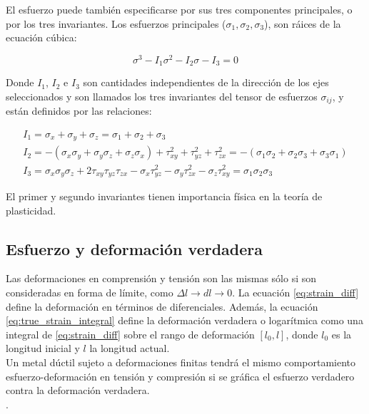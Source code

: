 El esfuerzo puede también especificarse por sus tres componentes principales, o por 
los tres invariantes. Los esfuerzos principales ($\sigma_1, \sigma_2, \sigma_3$), son 
ráices de la ecuación cúbica:

\begin{equation}
\sigma^3 - I_1 \sigma^2 - I_2 \sigma - I_3 = 0
\end{equation}

Donde $I_1$, $I_2$ e $I_3$ son cantidades independientes de la dirección de los ejes 
seleccionados y son llamados los tres invariantes del tensor de esfuerzos $\sigma_{ij}$, y están definidos 
por las relaciones:

\begin{align}
I_1 = \sigma_x + \sigma_y + \sigma_z = \sigma_1 + \sigma_2 + \sigma_3 \\
I_2 = -\left( \sigma_x \sigma_y + \sigma_y \sigma_z + \sigma_z \sigma_x \right) + \tau_{xy}^2 + 
\tau_{yz}^2 + \tau_{zx}^2 = -(\sigma_1 \sigma_2 + \sigma_2 \sigma_3 + \sigma_3 \sigma_1) \\
I_3 = \sigma_x \sigma_y \sigma_z + 2 \tau_{xy} \tau_{yz} \tau_{zx} - \sigma_x \tau_{yz}^2 - \sigma_y \tau_{zx}^2 - 
\sigma_z \tau_{xy}^2 = \sigma_1 \sigma_2 \sigma_3
\end{align}

El primer y segundo invariantes tienen importancia física en la teoría de plasticidad.\\


\subsection{Esfuerzo y deformación verdadera} \label{subsec:true_strain_stress}

Las deformaciones en comprensión y tensión son las mismas sólo si son consideradas 
en forma de límite, como $\Delta l \to dl  \to 0$. La ecuación \ref{eq:strain_diff} 
define la deformación en términos de diferenciales. Además, la ecuación 
\ref{eq:true_strain_integral} define la deformación verdadera o logarítmica como una integral 
de \ref{eq:strain_diff} sobre el rango de deformación $[l_0, l]$, donde 
$l_0$ es la longitud inicial y $l$ la longitud actual.\\

Un metal dúctil sujeto a deformaciones finitas tendrá el mismo comportamiento esfuerzo-deformación 
en tensión y compresión si se gráfica el esfuerzo verdadero contra la deformación verdadera.
~\cite{abaqus-gs-manual} \\.

